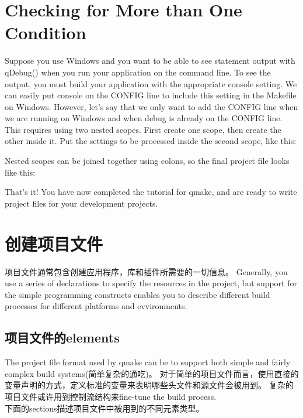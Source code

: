 \section{Checking for More than One Condition}
Suppose you use Windows and you want to be able to see statement output with qDebug() when you run your application on the command line. To see the output, you must build your application with the appropriate console setting. We can easily put console on the CONFIG line to include this setting in
the Makefile on Windows. However, let's say that we only want to add the CONFIG line when we are running on Windows and when debug is already on the CONFIG line. This requires using two nested scopes. First create one scope, then create the other inside it. Put the settings to be processed inside
the second scope, like this:
\begin{center}
  {}
\end{center}
Nested scopes can be joined together using colons, so the final project file looks like this:
\begin{center}
  {}
\end{center}
That's it! You have now completed the tutorial for qmake, and are ready to write project files for your development projects.

\section{创建项目文件}
项目文件通常包含创建应用程序，库和插件所需要的一切信息。%
Generally, you use a series of declarations to specify the resources in the project,
but support for the simple programming constructs enables you to describe different build processes for
different platforms and evvironments.

\subsection{项目文件的elements}
The project file format used by qmake can be to support both simple and fairly complex build systems(简单复杂的通吃)。%
对于简单的项目文件而言，使用直接的变量声明的方式，定义标准的变量来表明哪些头文件和源文件会被用到。%
复杂的项目文件或许用到控制流结构来fine-tune the build process.%
\\\newline
下面的sections描述项目文件中被用到的不同元素类型。%

